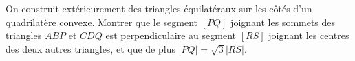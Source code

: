 On construit extérieurement des triangles équilatéraux sur les côtés d'un quadrilatère convexe. Montrer que le segment $[PQ]$ joignant les sommets des triangles $ABP$ et $CDQ$ est perpendiculaire au segment $[RS]$ joignant les centres des deux autres triangles, et que de plus $|PQ| = \sqrt{3}|RS|$.
